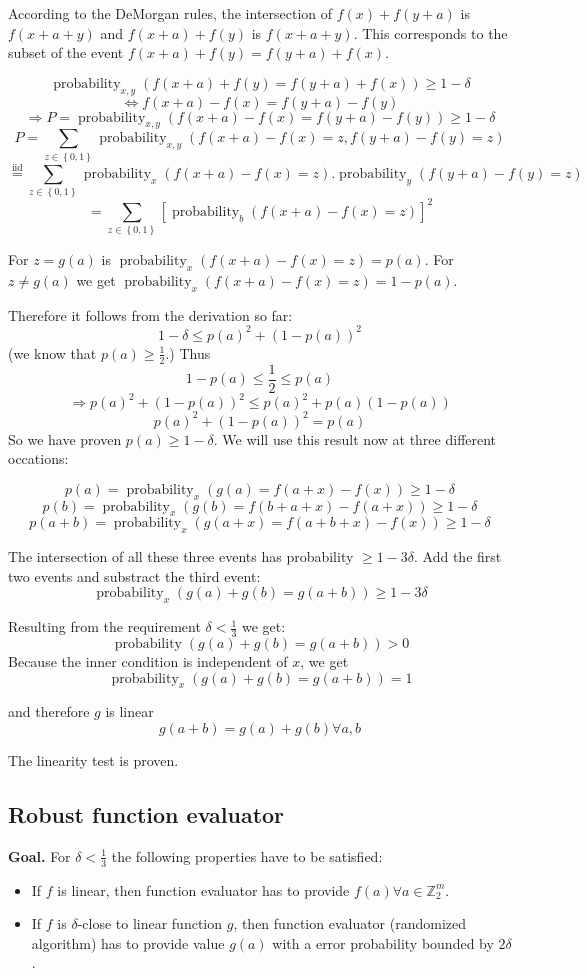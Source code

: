 \documentclass[a4paper]{article}
\newcommand{\set}[1]{\left\{#1\right\}}
\DeclareMathOperator{\prop}{probability}
\begin{document}
According to the DeMorgan rules, the intersection of $f(x) + f(y + a)$
is $f(x + a + y)$ and $f(x + a) + f(y)$ is $f(x + a + y)$. This corresponds
to the subset of the event $f(x + a) + f(y) = f(y + a) + f(x)$.

\[
  \prop_{x,y}(f(x + a) + f(y) = f(y + a) + f(x)) \geq 1 - \delta
\] \[
  \Leftrightarrow f(x + a) - f(x) = f(y + a) - f(y)
\] \[
  \Rightarrow P = \prop_{x,y}(f(x + a) - f(x) = f(y + a) - f(y)) \geq 1 - \delta
\] \[ 
  P = \sum_{z\in\set{0,1}} \prop_{x,y} (f(x+a) - f(x) = z, f(y+a) - f(y) = z)
\] \[
  \stackrel{\text{iid}}{=} \sum_{z \in \set{0,1}} \prop_x
    (f(x + a) - f(x) = z) . \prop_y(f(y+a) - f(y) = z)
\] \[
  = \sum_{z\in\set{0,1}} \left[\prop_b(f(x + a) - f(x) = z)\right]^2
\]

For $z = g(a)$ is $\prop_x(f(x + a) - f(x) = z) = p(a)$.
For $z \neq g(a)$ we get $\prop_x(f(x + a) - f(x) = z) = 1 - p(a)$.

Therefore it follows from the derivation so far:
\[
  1 - \delta \leq p(a)^2 + (1 - p(a))^2
\]
(we know that $p(a) \geq \frac12$.) Thus
\[
  1 - p(a) \leq \frac12 \leq p(a)
\] \[
  \Rightarrow p(a)^2 + (1 - p(a))^2 \leq p(a)^2 + p(a)(1 - p(a))
\] \[
  p(a)^2 + (1 - p(a))^2 = p(a)
\]
So we have proven $p(a) \geq 1 - \delta$.
We will use this result now at three different occations:

\[
  p(a) = \prop_x(g(a) = f(a + x) - f(x)) \geq 1 - \delta
\] \[
  p(b) = \prop_x(g(b) = f(b + a + x) - f(a + x)) \geq 1 - \delta
\] \[
  p(a + b) = \prop_x(g(a + x) = f(a + b + x) - f(x)) \geq 1 - \delta
\]

The intersection of all these three events has probability $\geq 1 - 3\delta$.
Add the first two events and substract the third event:
\[
  \prop_x(g(a) + g(b) = g(a + b)) \geq 1 - 3\delta
\]

Resulting from the requirement $\delta < \frac13$ we get:
\[
  \prop(g(a) + g(b) = g(a+b)) > 0
\]
Because the inner condition is independent of $x$, we get
\[
  \prop_x(g(a) + g(b) = g(a + b)) = 1
\]

and therefore $g$ is linear
\[
  g(a + b) = g(a) + g(b) \forall a, b
\]

The linearity test is proven.

\subsection{Robust function evaluator}
%
\textbf{Goal.} For $\delta < \frac13$ the following properties have to be satisfied:
\begin{itemize}
  \item If $f$ is linear, then function evaluator has to provide
        $f(a) \forall a \in \mathbb{Z}_2^m$.
  \item If $f$ is $\delta$-close to linear function $g$, then
        function evaluator (randomized algorithm) has to provide
        value $g(a)$ with a error probability bounded by $2\delta$.
\end{itemize}
\end{document}
